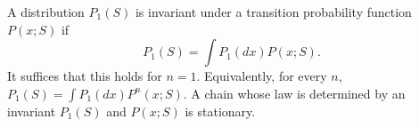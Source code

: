 A distribution $P_1(S)$ is invariant under a transition probability function $P(x; S)$ if
$$P_1(S) = \int P_1(dx) P(x; S).$$
It suffices that this holds for $n = 1$. Equivalently, for every $n$, $P_1(S) = \int P_1(dx) P^n(x; S)$. A chain whose law is determined by an invariant $P_1(S)$ and $P(x; S)$ is stationary.
